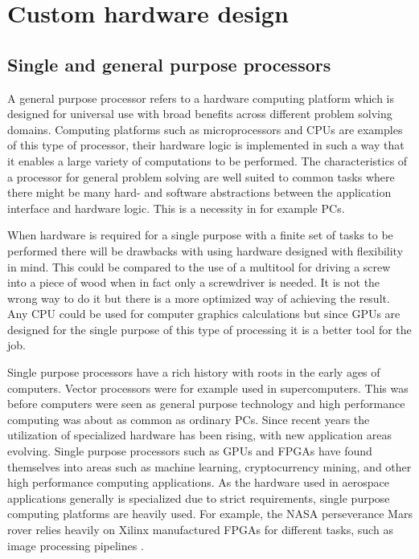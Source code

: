 \documentclass[12pt]{report}
\begin{document}

\chapter{Custom hardware design}
\section{Single and general purpose processors}
A general purpose processor refers to a hardware computing platform which is designed for universal use with broad benefits across different problem solving domains. Computing platforms such as microprocessors and CPUs are examples of this type of processor, their hardware logic is implemented in such a way that it enables a large variety of computations to be performed. 
The characteristics of a processor for general problem solving are well suited to common tasks where there might be many hard- and software abstractions between the application interface and hardware logic. This is a necessity in for example PCs.
\par
When hardware is required for a single purpose with a finite set of tasks to be performed there will be drawbacks with using hardware designed with flexibility in mind. This could be compared to the use of a multitool for driving a screw into a piece of wood when in fact only a screwdriver is needed. It is not the wrong way to do it but there is a more optimized way of achieving the result. Any CPU could be used for computer graphics calculations but since GPUs are designed for the single purpose of this type of processing it is a better tool for the job.
\par
Single purpose processors have a rich history with roots in the early ages of computers. Vector processors were for example used in supercomputers.
This was before computers were seen as general purpose technology and high performance computing was about as common as ordinary PCs.
Since recent years the utilization of specialized hardware has been rising, with new application areas evolving. Single purpose processors such as GPUs and FPGAs have found themselves into areas such as machine learning, cryptocurrency mining, and other high performance computing applications.
As the hardware used in aerospace applications generally is specialized due to strict requirements, single purpose computing platforms are heavily used. For example, the NASA perseverance Mars rover relies heavily on Xilinx manufactured FPGAs for different tasks, such as image processing pipelines \citep{XilPerservance}.
\end{document}
